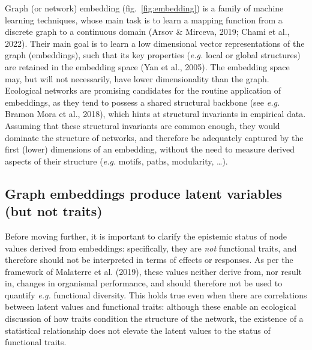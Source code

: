 \documentclass[11pt]{article}
\begin{document}
Graph (or network) embedding (fig.~\ref{fig:embedding}) is a family of
machine learning techniques, whose main task is to learn a mapping
function from a discrete graph to a continuous domain (Arsov \& Mirceva,
2019; Chami et al., 2022). Their main goal is to learn a low dimensional
vector representations of the graph (embeddings), such that its key
properties (\emph{e.g.} local or global structures) are retained in the
embedding space (Yan et al., 2005). The embedding space may, but will
not necessarily, have lower dimensionality than the graph. Ecological
networks are promising candidates for the routine application of
embeddings, as they tend to possess a shared structural backbone (see
\emph{e.g.} Bramon Mora et al., 2018), which hints at structural
invariants in empirical data. Assuming that these structural invariants
are common enough, they would dominate the structure of networks, and
therefore be adequately captured by the first (lower) dimensions of an
embedding, without the need to measure derived aspects of their
structure (\emph{e.g.} motifs, paths, modularity, \ldots).

\hypertarget{graph-embeddings-produce-latent-variables-but-not-traits}{%
\subsection{Graph embeddings produce latent variables (but not
traits)}\label{graph-embeddings-produce-latent-variables-but-not-traits}}

Before moving further, it is important to clarify the epistemic status
of node values derived from embeddings: specifically, they are
\emph{not} functional traits, and therefore should not be interpreted in
terms of effects or responses. As per the framework of Malaterre et al.
(2019), these values neither derive from, nor result in, changes in
organismal performance, and should therefore not be used to quantify
\emph{e.g.} functional diversity. This holds true even when there are
correlations between latent values and functional traits: although these
enable an ecological discussion of how traits condition the structure of
the network, the existence of a statistical relationship does not
elevate the latent values to the status of functional traits.
\end{document}
